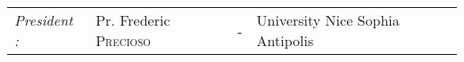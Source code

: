 \begin{titlepage}
\begin{center}
\begin{tabular}{llcl}
      \textit{President :}	&Pr. Frederic \textsc{Precioso}		& - & University Nice Sophia Antipolis\\
      				
\end{tabular}
\end{center}
\end{titlepage}
\sloppy

\titlepage
